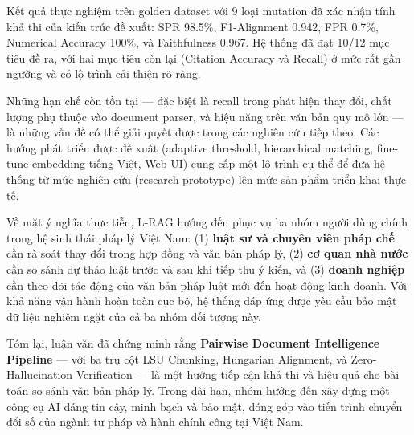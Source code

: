Kết quả thực nghiệm trên golden dataset với 9 loại mutation đã xác nhận tính khả thi của kiến trúc đề xuất: SPR 98.5\%, F1-Alignment 0.942, FPR 0.7\%, Numerical Accuracy 100\%, và Faithfulness 0.967. Hệ thống đã đạt 10/12 mục tiêu đề ra, với hai mục tiêu còn lại (Citation Accuracy và Recall) ở mức rất gần ngưỡng và có lộ trình cải thiện rõ ràng.

Những hạn chế còn tồn tại — đặc biệt là recall trong phát hiện thay đổi, chất lượng phụ thuộc vào document parser, và hiệu năng trên văn bản quy mô lớn — là những vấn đề có thể giải quyết được trong các nghiên cứu tiếp theo. Các hướng phát triển được đề xuất (adaptive threshold, hierarchical matching, fine-tune embedding tiếng Việt, Web UI) cung cấp một lộ trình cụ thể để đưa hệ thống từ mức nghiên cứu (research prototype) lên mức sản phẩm triển khai thực tế.

Về mặt ý nghĩa thực tiễn, L-RAG hướng đến phục vụ ba nhóm người dùng chính trong hệ sinh thái pháp lý Việt Nam: (1) \textbf{luật sư và chuyên viên pháp chế} cần rà soát thay đổi trong hợp đồng và văn bản pháp lý, (2) \textbf{cơ quan nhà nước} cần so sánh dự thảo luật trước và sau khi tiếp thu ý kiến, và (3) \textbf{doanh nghiệp} cần theo dõi tác động của văn bản pháp luật mới đến hoạt động kinh doanh. Với khả năng vận hành hoàn toàn cục bộ, hệ thống đáp ứng được yêu cầu bảo mật dữ liệu nghiêm ngặt của cả ba nhóm đối tượng này.

Tóm lại, luận văn đã chứng minh rằng \textbf{Pairwise Document Intelligence Pipeline} — với ba trụ cột LSU Chunking, Hungarian Alignment, và Zero-Hallucination Verification — là một hướng tiếp cận khả thi và hiệu quả cho bài toán so sánh văn bản pháp lý. Trong dài hạn, nhóm hướng đến xây dựng một công cụ AI đáng tin cậy, minh bạch và bảo mật, đóng góp vào tiến trình chuyển đổi số của ngành tư pháp và hành chính công tại Việt Nam.
